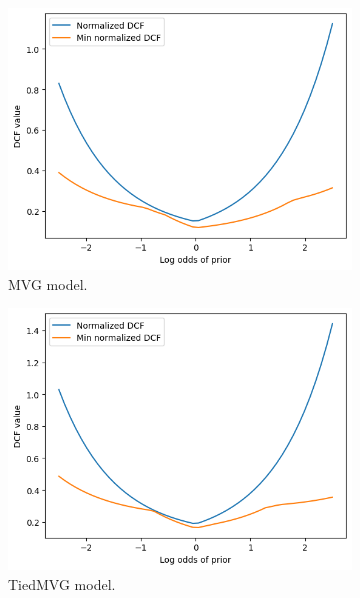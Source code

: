 \documentclass{article}
\begin{document}
\begin{figure}[ht]
    \centering
    \begin{subfigure}[b]{0.3\textwidth}
        \centering
        \includegraphics[width=\textwidth]{images/mvg_bayes_error.png}
        \caption{MVG model.}
    \end{subfigure}
    \hfill
    \begin{subfigure}[b]{0.3\textwidth}
        \centering
        \includegraphics[width=\textwidth]{images/mvg_bayes_error_tied.png}
        \caption{TiedMVG model.}
    \end{subfigure}
    \hfill
    \begin{subfigure}[b]{0.3\textwidth}
        \centering

\end{subfigure}
\end{figure}
\end{document}
